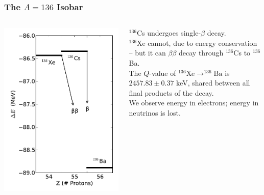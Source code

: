 \documentclass{beamer}
\begin{document}
\begin{frame}
\begin{center}
\frametitle{The $A=136$ Isobar}
\end{center}
\begin{columns}
\begin{column}{.5\textwidth}
\includegraphics[keepaspectratio=true,width=\textwidth]{LevelDiagram.pdf}\\
\end{column}
\begin{column}{.5\textwidth}
$^{136}$Cs undergoes single-$\beta$ decay.\\[\baselineskip]
$^{136}$Xe cannot, due to energy conservation -- but it can $\beta\beta$ decay through $^{136}$Cs to $^{136}$Ba.\\[\baselineskip]
The $Q$-value of $^{136}\text{Xe}\rightarrow ^{136}\text{Ba}$ is $2457.83 \pm 0.37$ keV, shared between all final products of the decay.\\[\baselineskip]
We observe energy in electrons; energy in neutrinos is lost.
\end{column}
\end{columns}
\end{frame}
\end{document}
